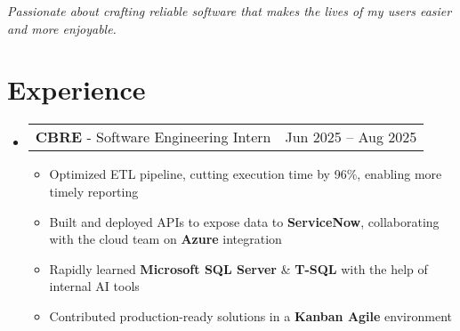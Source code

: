 \documentclass[letterpaper,11pt]{article}
\makeatletter
\newcommand{\resumeItem}[1]{
  \item\small{
    {#1 \vspace{-2pt}}
  }
}
\newcommand{\resumeProjectHeading}[2]{
    \item
    \begin{tabular*}{0.97\textwidth}{l@{\extracolsep{\fill}}r}
      \small#1 & #2 \\
    \end{tabular*}\vspace{-7pt}
}
\newcommand{\resumeSubHeadingListStart}{\begin{itemize}[leftmargin=0.15in, label={}]}
\newcommand{\resumeSubHeadingListEnd}{\end{itemize}}
\newcommand{\resumeItemListStart}{\begin{itemize}}
\newcommand{\resumeItemListEnd}{\end{itemize}\vspace{-5pt}}
\makeatother
\begin{document}
\begin{center}
  \emph{Passionate about crafting reliable software that makes the lives of my users easier and more enjoyable.}
\end{center}

\section{Experience}
  \resumeSubHeadingListStart
    \resumeProjectHeading{\textbf{CBRE} - Software Engineering Intern}{Jun 2025 -- Aug 2025}
  \resumeItemListStart
    \resumeItem{Optimized ETL pipeline, cutting execution time by 96\%, enabling more timely reporting}
    \resumeItem{Built and deployed APIs to expose data to \textbf{ServiceNow}, collaborating with the cloud team on \textbf{Azure} integration}
    \resumeItem{Rapidly learned \textbf{Microsoft SQL Server} \& \textbf{T-SQL} with the help of internal AI tools}
    \resumeItem{Contributed production-ready solutions in a \textbf{Kanban Agile} environment}
  \resumeItemListEnd

  \resumeSubHeadingListEnd

\end{document}
